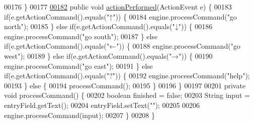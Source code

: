 \begin{DoxyCode}
00176     \}
00177 
\hypertarget{UserInterface_8java_source_l00182}{}\hyperlink{classUserInterface_a0a1ee40a4dbca4aeee002c3d0537c7d5}{00182}     \textcolor{keyword}{public} \textcolor{keywordtype}{void} \hyperlink{classUserInterface_a0a1ee40a4dbca4aeee002c3d0537c7d5}{actionPerformed}(ActionEvent e) \{
00183         \textcolor{keywordflow}{if}(e.getActionCommand().equals(\textcolor{stringliteral}{"↑"})) \{
00184             engine.processCommand(\textcolor{stringliteral}{"go north"});
00185         \} \textcolor{keywordflow}{else} \textcolor{keywordflow}{if}(e.getActionCommand().equals(\textcolor{stringliteral}{"↓"})) \{
00186             engine.processCommand(\textcolor{stringliteral}{"go south"});
00187         \} \textcolor{keywordflow}{else} \textcolor{keywordflow}{if}(e.getActionCommand().equals(\textcolor{stringliteral}{"←"})) \{
00188             engine.processCommand(\textcolor{stringliteral}{"go west"});
00189         \} \textcolor{keywordflow}{else} \textcolor{keywordflow}{if}(e.getActionCommand().equals(\textcolor{stringliteral}{"→"})) \{
00190             engine.processCommand(\textcolor{stringliteral}{"go east"});
00191         \} \textcolor{keywordflow}{else} \textcolor{keywordflow}{if}(e.getActionCommand().equals(\textcolor{stringliteral}{"?"})) \{
00192             engine.processCommand(\textcolor{stringliteral}{"help"});
00193         \} \textcolor{keywordflow}{else} \{
00194             processCommand();
00195         \}
00196     \}
00197 
00201     \textcolor{keyword}{private} \textcolor{keywordtype}{void} processCommand() \{
00202         \textcolor{keywordtype}{boolean} finished = \textcolor{keyword}{false};
00203         String input = entryField.getText();
00204         entryField.setText(\textcolor{stringliteral}{""});
00205 
00206         engine.processCommand(input);
00207     \}
00208 \}
\end{DoxyCode}
